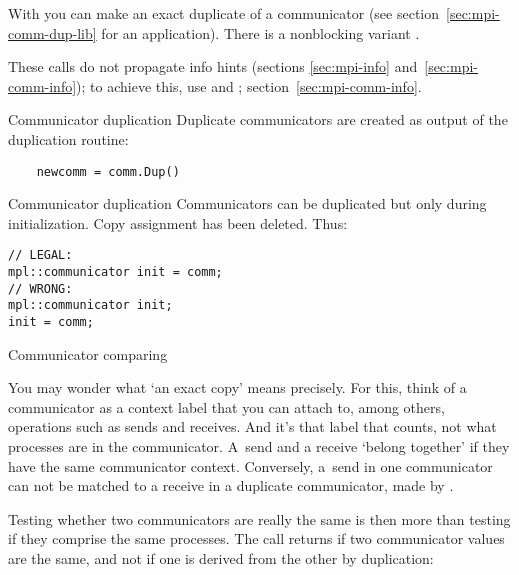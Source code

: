 
With 
you can make an exact duplicate of a communicator
(see section~\ref{sec:mpi-comm-dup-lib} for an application).
There is a nonblocking variant .

These calls do not propagate info hints
(sections \ref{sec:mpi-info} and~\ref{sec:mpi-comm-info});
to achieve this,
use  and ;
section~\ref{sec:mpi-comm-info}.

\begin{pythonnote}{Communicator duplication}
  Duplicate communicators are created as output of the duplication routine:
  \begin{lstlisting}
    newcomm = comm.Dup()
  \end{lstlisting}
\end{pythonnote}

\begin{mplnote}{Communicator duplication}
  Communicators can be duplicated but only during initialization.
  Copy assignment has been deleted. Thus:
\begin{lstlisting}
// LEGAL: 
mpl::communicator init = comm;
// WRONG:
mpl::communicator init;
init = comm;
\end{lstlisting}
\end{mplnote}

 {Communicator comparing}
\label{sec:comm-compare}

You may wonder what `an exact copy' means precisely.
For this, think of a communicator as a context label that you can attach to,
among others, operations such as sends and receives.
And it's that label that counts, not what processes are in the communicator.
A~send and a receive `belong together' if they have the same communicator context.
Conversely, a~send in one communicator can not be matched
to a receive in a duplicate communicator, made by .

Testing whether two communicators are really the same
is then more than testing if they comprise the same processes.
The call  returns 
if two communicator values are the same,
and not if one is derived from the other by duplication:
%

